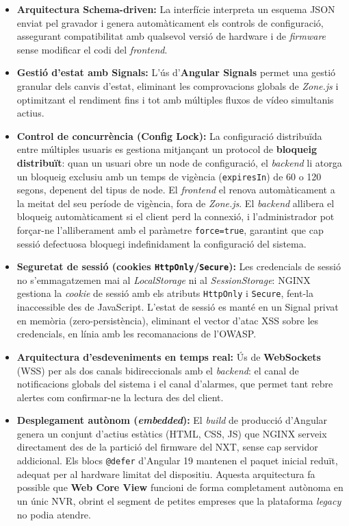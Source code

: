 \begin{itemize}
  \item \textbf{Arquitectura Schema-driven:} La interfície interpreta un esquema JSON enviat pel gravador i genera automàticament els controls de configuració, assegurant compatibilitat amb qualsevol versió de hardware i de \textit{firmware} sense modificar el codi del \textit{frontend}.
  \item \textbf{Gestió d'estat amb Signals:} L'ús d'\textbf{Angular Signals} permet una gestió granular dels canvis d'estat, eliminant les comprovacions globals de \textit{Zone.js} i optimitzant el rendiment fins i tot amb múltiples fluxos de vídeo simultanis actius.
  \item \textbf{Control de concurrència (Config Lock):} La configuració distribuïda entre múltiples usuaris es gestiona mitjançant un protocol de \textbf{bloqueig distribuït}: quan un usuari obre un node de configuració, el \textit{backend} li atorga un bloqueig exclusiu amb un temps de vigència (\texttt{expiresIn}) de 60 o 120 segons, depenent del tipus de node. El \textit{frontend} el renova automàticament a la meitat del seu període de vigència, fora de \textit{Zone.js}. El \textit{backend} allibera el bloqueig automàticament si el client perd la connexió, i l'administrador pot forçar-ne l'alliberament amb el paràmetre \texttt{force=true}, garantint que cap sessió defectuosa bloquegi indefinidament la configuració del sistema.
  \item \textbf{Seguretat de sessió (cookies \texttt{HttpOnly}/\texttt{Secure}):} Les credencials de sessió no s'emmagatzemen mai al \textit{LocalStorage} ni al \textit{SessionStorage}: NGINX gestiona la \textit{cookie} de sessió amb els atributs \texttt{HttpOnly} i \texttt{Secure}, fent-la inaccessible des de JavaScript. L'estat de sessió es manté en un Signal privat en memòria (zero-persistència), eliminant el vector d'atac XSS sobre les credencials, en línia amb les recomanacions de l'OWASP.
  \item \textbf{Arquitectura d'esdeveniments en temps real:} Ús de \textbf{WebSockets} (WSS) per als dos canals bidireccionals amb el \textit{backend}: el canal de notificacions globals del sistema i el canal d'alarmes, que permet tant rebre alertes com confirmar-ne la lectura des del client.
  \item \textbf{Desplegament autònom (\textit{embedded}):} El \textit{build} de producció d'Angular genera un conjunt d'actius estàtics (HTML, CSS, JS) que NGINX serveix directament des de la partició del firmware del NXT, sense cap servidor addicional. Els blocs \texttt{@defer} d'Angular 19 mantenen el paquet inicial reduït, adequat per al hardware limitat del dispositiu. Aquesta arquitectura fa possible que \textbf{Web Core View} funcioni de forma completament autònoma en un únic NVR, obrint el segment de petites empreses que la plataforma \textit{legacy} no podia atendre.
\end{itemize}

